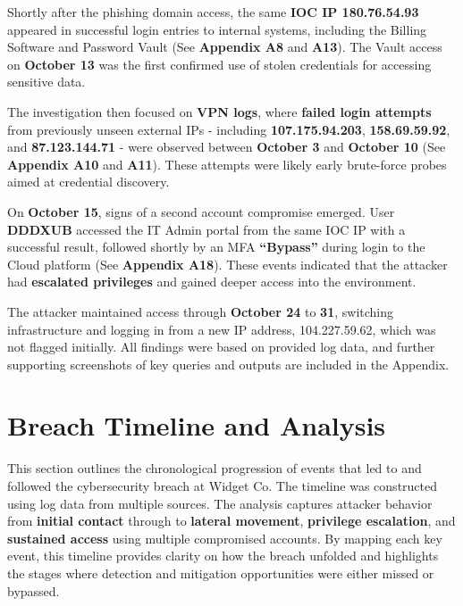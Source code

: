 \documentclass[11pt]{article}
\begin{document}
	\vspace{1em}
	\par Shortly after the phishing domain access, the same \textbf{IOC IP 180.76.54.93} appeared in successful login entries to internal systems, including the Billing Software and Password Vault (See \textbf{Appendix A8} and \textbf{A13}). The Vault access on \textbf{October 13} was the first confirmed use of stolen credentials for accessing sensitive data.
	
	\vspace{1em}
	\par The investigation then focused on \textbf{VPN logs}, where \textbf{failed login attempts} from previously unseen external IPs - including \textbf{107.175.94.203}, \textbf{158.69.59.92}, and \textbf{87.123.144.71} - were observed between \textbf{October 3} and \textbf{October 10} (See \textbf{Appendix A10} and \textbf{A11}). These attempts were likely early brute-force probes aimed at credential discovery.
	
	\vspace{1em}
	\par On \textbf{October 15}, signs of a second account compromise emerged. User \textbf{DDDXUB} accessed the IT Admin portal from the same IOC IP with a successful result, followed shortly by an MFA \textbf{“Bypass”} during login to the Cloud platform (See \textbf{Appendix A18}). These events indicated that the attacker had \textbf{escalated privileges} and gained deeper access into the environment.
	
	\vspace{1em}
	\par The attacker maintained access through \textbf{October 24} to \textbf{31}, switching infrastructure and logging in from a new IP address, 104.227.59.62, which was not flagged initially. All findings were based on provided log data, and further supporting screenshots of key queries and outputs are included in the Appendix.
	
	\newpage
	\section{Breach Timeline and Analysis}
	
	\hspace{1.5em} This section outlines the chronological progression of events that led to and followed the cybersecurity breach at Widget Co. The timeline was constructed using log data from multiple sources. The analysis captures attacker behavior from \textbf{initial contact} through to \textbf{lateral movement}, \textbf{privilege escalation}, and \textbf{sustained access} using multiple compromised accounts. By mapping each key event, this timeline provides clarity on how the breach unfolded and highlights the stages where detection and mitigation opportunities were either missed or bypassed.
	
\end{document}
